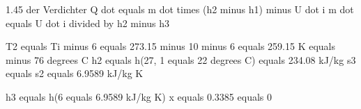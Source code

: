 1.45 der Verdichter
Q dot equals m dot times (h2 minus h1) minus U dot i
m dot equals U dot i divided by h2 minus h3

T2 equals Ti minus 6 equals 273.15 minus 10 minus 6 equals 259.15 K equals minus 76 degrees C
h2 equals h(27, 1 equals 22 degrees C) equals 234.08 kJ/kg
s3 equals s2 equals 6.9589 kJ/kg K

h3 equals h(6 equals 6.9589 kJ/kg K)
x equals 0.3385 equals 0
